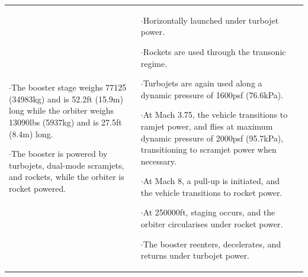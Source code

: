 {\begin{landscape}
\begin{xltabular}{\linewidth}{|X|X|X|}
	$\cdot$The booster stage weighs 77125 (34983kg) and is 52.2ft (15.9m) long while the orbiter weighs 13090lbs (5937kg) and is 27.5ft (8.4m) long.
	
	$\cdot$The booster is powered by turbojets, dual-mode scramjets, and rockets, while the orbiter is rocket powered.
	
	&\small
	
	$\cdot$Horizontally launched under turbojet power.
	
	$\cdot$Rockets are used through the transonic regime.
	
	$\cdot$Turbojets are again used along a dynamic pressure of 1600psf (76.6kPa). 
	
	$\cdot$At Mach 3.75, the vehicle transitions to ramjet power, and flies at maximum dynamic pressure of 2000psf (95.7kPa), transitioning to scramjet power when necessary.
	
	$\cdot$At Mach 8, a pull-up is initiated, and the vehicle transitions to rocket power. 
	
	$\cdot$At 250000ft, staging occurs, and the orbiter circularises under rocket power. 
	
	$\cdot$The booster reenters, decelerates, and returns under turbojet power.  
	\\
	

\end{xltabular}
\end{landscape}}
